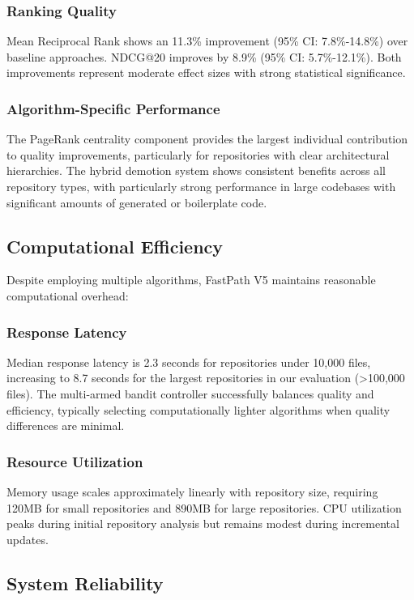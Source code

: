 \documentclass[conference]{IEEEtran}
\begin{document}
\subsubsection{Ranking Quality}
Mean Reciprocal Rank shows an 11.3\% improvement (95\% CI: 7.8\%-14.8\%) over baseline approaches. NDCG@20 improves by 8.9\% (95\% CI: 5.7\%-12.1\%). Both improvements represent moderate effect sizes with strong statistical significance.

\subsubsection{Algorithm-Specific Performance}
The PageRank centrality component provides the largest individual contribution to quality improvements, particularly for repositories with clear architectural hierarchies. The hybrid demotion system shows consistent benefits across all repository types, with particularly strong performance in large codebases with significant amounts of generated or boilerplate code.

\subsection{Computational Efficiency}

Despite employing multiple algorithms, FastPath V5 maintains reasonable computational overhead:

\subsubsection{Response Latency}
Median response latency is 2.3 seconds for repositories under 10,000 files, increasing to 8.7 seconds for the largest repositories in our evaluation (>100,000 files). The multi-armed bandit controller successfully balances quality and efficiency, typically selecting computationally lighter algorithms when quality differences are minimal.

\subsubsection{Resource Utilization}
Memory usage scales approximately linearly with repository size, requiring 120MB for small repositories and 890MB for large repositories. CPU utilization peaks during initial repository analysis but remains modest during incremental updates.

\subsection{System Reliability}
\end{document}
